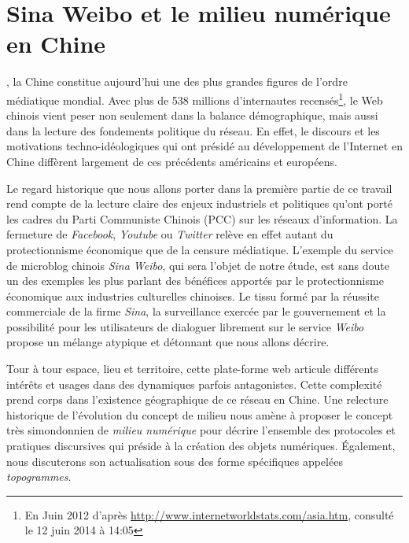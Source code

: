 ﻿\chapter{Sina Weibo et le milieu numérique en Chine} 

, la Chine constitue aujourd'hui une des plus grandes figures de l'ordre médiatique mondial. Avec plus de 538 millions d'internautes recensés\footnote{En Juin 2012 d'après  \url{http://www.internetworldstats.com/asia.htm}, consulté le 12 juin 2014 à 14:05}, le Web chinois vient peser non seulement dans la balance démographique, mais aussi dans la lecture des fondements politique du réseau. En effet, le discours et les motivations techno-idéologiques qui ont présidé au développement de l'Internet en Chine diffèrent largement de ces précédents américains et européens. 

Le regard historique que nous allons porter dans la première partie de ce travail rend compte de la lecture claire des enjeux industriels et politiques qu'ont porté les cadres du Parti Communiste Chinois (PCC) sur les réseaux d'information. La fermeture de \textit{Facebook}, \textit{Youtube} ou \textit{Twitter} relève en effet autant du protectionnisme économique que de la censure médiatique. L'exemple du service de microblog chinois \textit{Sina Weibo}, qui sera l'objet de notre étude, est sans doute un des exemples les plus parlant des bénéfices apportés par le protectionnisme économique aux industries culturelles chinoises. Le tissu formé par la réussite commerciale de la firme \textit{Sina}, la surveillance exercée par le gouvernement et la  possibilité pour les utilisateurs de dialoguer librement sur le service \textit{Weibo} propose un mélange atypique et détonnant que nous allons décrire.

Tour à tour espace, lieu et territoire, cette plate-forme web articule  différents intérêts et usages dans des dynamiques parfois antagonistes. Cette complexité prend corps dans l'existence géographique de ce réseau en Chine. Une relecture historique de l'évolution du concept de milieu nous amène à proposer le concept très simondonnien de \textit{milieu numérique} pour décrire l’ensemble des protocoles et pratiques discursives qui préside à la création des objets numériques. Également, nous discuterons son actualisation sous des forme spécifiques appelées \textit{topogrammes}.


